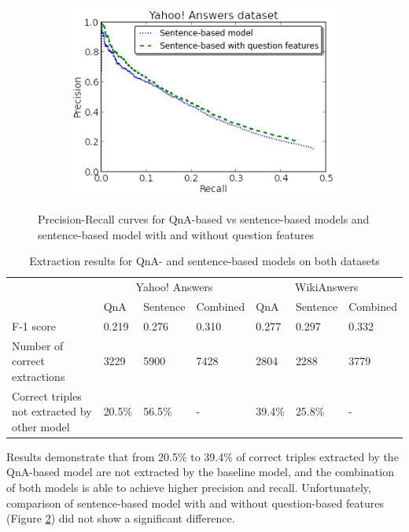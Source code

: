 \begin{figure}[h!]
\begin{subfigure}[h]{0.45\textwidth}
	\includegraphics[width=0.99\textwidth]{img/cqarelextract_noqf_vs_qf}
	\vspace{-1mm}
	\label{figure:pr:noqf_vs_qf}
\end{subfigure}
\vspace{-1mm}
\caption{Precision-Recall curves for QnA-based vs sentence-based models and sentence-based model with and without question features}
\label{figure:qna_relextract:pr_curve}
\end{figure}

\begin{table}[tbh]
\centering
\begin{tabular}{|p{6.6cm}||p{0.9cm}|p{1.4cm}|p{1.6cm}||p{0.9cm}|p{1.4cm}|p{1.6cm}|}
\hline
& \multicolumn{3}{|c||}{Yahoo! Answers} & \multicolumn{3}{|c|}{WikiAnswers}\\
\cline{2-7}
& QnA & Sentence & Combined & QnA & Sentence & Combined\\
\hline
F-1 score & 0.219 & 0.276 & 0.310 & 0.277 & 0.297 & 0.332\\
Number of correct extractions & 3229 & 5900 & 7428 & 2804 & 2288 & 3779 \\
Correct triples not extracted by other model & 20.5\% & 56.5\% & - & 39.4\% & 25.8\% & - \\
\hline
\end{tabular}
\caption{Extraction results for QnA- and sentence-based models on both datasets}
\label{table:qna_relextract:results}
\end{table}

Results demonstrate that from 20.5\% to 39.4\% of correct triples extracted by the QnA-based model are not extracted by the baseline model, and the combination of both models is able to achieve higher precision and recall.
Unfortunately, comparison of sentence-based model with and without question-based features (Figure \ref{figure:qna_relextract:pr_curve}) did not show a significant difference.


